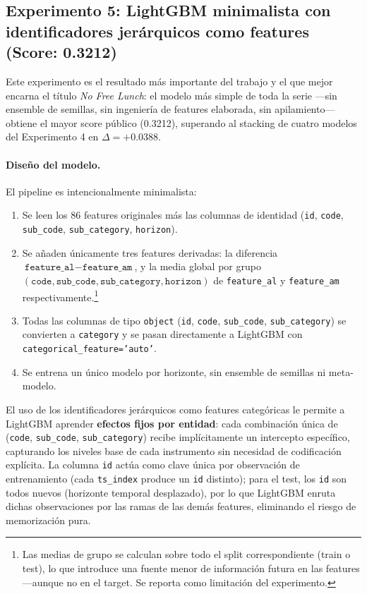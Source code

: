 \documentclass{article}
\begin{document}
\subsection{Experimento 5: LightGBM minimalista con identificadores jerárquicos como features (Score: 0.3212)}

Este experimento es el resultado más importante del trabajo y el que mejor encarna el título \emph{No Free Lunch}: el modelo más simple de toda la serie —sin ensemble de semillas, sin ingeniería de features elaborada, sin apilamiento— obtiene el mayor score público (0.3212), superando al stacking de cuatro modelos del Experimento 4 en $\Delta = +0.0388$.

\paragraph{Diseño del modelo.}
El pipeline es intencionalmente minimalista:
\begin{enumerate}
    \item Se leen los 86 features originales más las columnas de identidad (\texttt{id}, \texttt{code}, \texttt{sub\_code}, \texttt{sub\_category}, \texttt{horizon}).
    \item Se añaden únicamente tres features derivadas: la diferencia $\texttt{feature\_al} - \texttt{feature\_am}$, y la media global por grupo $(\texttt{code}, \texttt{sub\_code}, \texttt{sub\_category}, \texttt{horizon})$ de \texttt{feature\_al} y \texttt{feature\_am} respectivamente.\footnote{Las medias de grupo se calculan sobre todo el split correspondiente (train o test), lo que introduce una fuente menor de información futura en las features —aunque no en el target. Se reporta como limitación del experimento.}
    \item Todas las columnas de tipo \texttt{object} (\texttt{id}, \texttt{code}, \texttt{sub\_code}, \texttt{sub\_category}) se convierten a \texttt{category} y se pasan directamente a LightGBM con \texttt{categorical\_feature='auto'}.
    \item Se entrena un único modelo por horizonte, sin ensemble de semillas ni meta-modelo.
\end{enumerate}

El uso de los identificadores jerárquicos como features categóricas le permite a LightGBM aprender \textbf{efectos fijos por entidad}: cada combinación única de (\texttt{code}, \texttt{sub\_code}, \texttt{sub\_category}) recibe implícitamente un intercepto específico, capturando los niveles base de cada instrumento sin necesidad de codificación explícita. La columna \texttt{id} actúa como clave única por observación de entrenamiento (cada \texttt{ts\_index} produce un \texttt{id} distinto); para el test, los \texttt{id} son todos nuevos (horizonte temporal desplazado), por lo que LightGBM enruta dichas observaciones por las ramas de las demás features, eliminando el riesgo de memorización pura.
\end{document}
